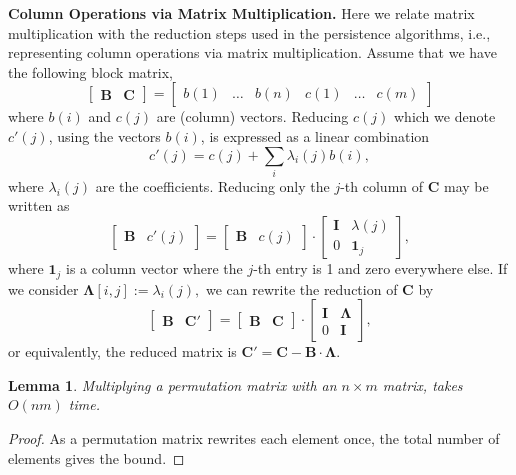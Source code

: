 \documentclass{article}
\newtheorem{lemma}[theorem]{Lemma}
\newtheorem{observation}[theorem]{Observation}
\newcommand{\matsize}[2]{#1\times #2}
\newcommand{\mat}[1]{\mathbf{#1}}
\renewcommand{\paragraph}[1]{\noindent\textbf{#1.}}
\begin{document}
\paragraph{\textbf{Column Operations via Matrix Multiplication}}
    Here we relate matrix multiplication with the reduction steps used in the persistence algorithms, i.e.,  representing column operations via matrix multiplication.  Assume that we have the following block matrix,
\[
\left[
    \begin{array}{c|c}\mat{B} &\mat{C}\end{array} \right] = \left[\begin{array}{ccc|ccc}b(1) &\ldots& b(n) &c(1) &\ldots & c(m) \end{array}\right]
\]
where $b(i)$ and $c(j)$ are (column) vectors. Reducing $c(j)$ which we denote $c'(j)$, using the vectors $b(i)$, is expressed as a linear combination
\[c'(j) = c(j) + \sum_i \lambda_i(j) b(i),\]
where $\lambda_i(j)$ are the coefficients. 
Reducing only the $j$-th column of $\mat{C}$ may be written as
\[\begin{bmatrix}\mat{B} & c'(j) \end{bmatrix} = 
\begin{bmatrix}\mat{B} &  c(j) \end{bmatrix}  \cdot  \begin{bmatrix}\mat{I} & \lambda(j) \\ 0 & \mat{1}_j  \end{bmatrix},
\]
where $\mat{1}_j$ is a column vector where the $j$-th entry is 1 and zero  everywhere else. If we consider
$\mat{\Lambda}[i,j] := 
\lambda_i(j),$
we can rewrite the reduction of $\mat{C}$ by
\[\begin{bmatrix}\mat{B} & \mat{C}' \end{bmatrix} = 
\begin{bmatrix}\mat{B} &  \mat{C} \end{bmatrix}  \cdot  \begin{bmatrix}\mat{I} & \mat{\Lambda}\\ 0 & \mat{I}  \end{bmatrix},
\]
or equivalently, the reduced matrix is %
$\mat{C}' =  \mat{C} - \mat{B} \cdot \mat{\Lambda}.$
\begin{lemma}\label{lem:perm}
    Multiplying a permutation matrix with an $\matsize{n}{m}$ matrix, takes $O(nm)$ time.
\end{lemma}
\begin{proof}
As a permutation matrix rewrites each element once, the total number of elements gives the bound. 
\end{proof}
\end{document}

